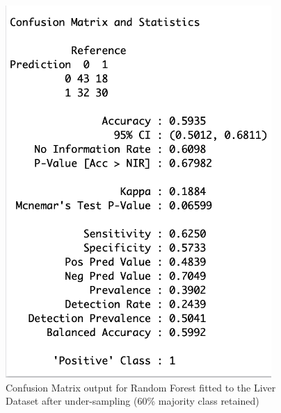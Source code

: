 \begin{figure}[!htbp]
\begin{minipage}{0.45\textwidth}
        \includegraphics[width=0.9\textwidth]{ThesisTemplate/appendix/images/Chapter5Appendix/ConfusionMatrix60/Liver.png}
        \caption{Confusion Matrix output for Random Forest fitted to the Liver Dataset after under-sampling (60\% majority class retained)}
        \label{fig:my_label}
    \end{minipage}
\end{figure}

